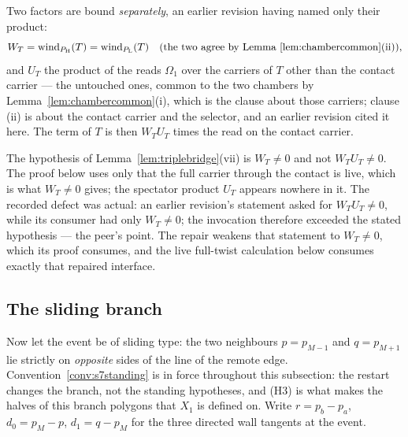 \begin{definition}
Two factors are bound \emph{separately}, an earlier revision having named only
their product:
\[
   W_T=\operatorname{wind}_{P_{\mathrm H}}(T)=\operatorname{wind}_{P_{\mathrm L}}(T)
   \quad\text{(the two agree by Lemma~\ref{lem:chambercommon}(ii))},
\]
and $U_T$ the product of the reads $\Omega_1$ over the carriers of $T$ other
than the contact carrier --- the untouched ones, common to the two chambers by
Lemma~\ref{lem:chambercommon}(i), which is the clause about those carriers;
clause (ii) is about the contact carrier and the selector, and an earlier
revision cited it here. The term of $T$ is then $W_TU_T$ times the read on the contact
carrier.
\end{definition}

\begin{remark}\label{rem:sr12hyp}
The hypothesis of Lemma~\ref{lem:triplebridge}(vii) is $W_T\neq0$ and not $W_TU_T\neq0$. The proof below uses only
that the full carrier through the contact is live, which is what $W_T\neq0$
gives; the spectator product $U_T$ appears nowhere in it. The recorded defect was actual: an earlier revision's statement asked for
$W_TU_T\neq0$, while its consumer had only $W_T\neq0$; the invocation therefore
exceeded the stated hypothesis --- the peer's point. The repair weakens that
statement to $W_T\neq0$, which its proof consumes, and the live full-twist
calculation below consumes exactly that repaired interface.

\end{remark}

\subsection{The sliding branch}\label{sec:sliding}

Now let the event be of sliding type: the two neighbours $p=p_{M-1}$ and
$q=p_{M+1}$ lie strictly on \emph{opposite} sides of the line of the remote
edge. Convention~\ref{conv:s7standing} is in force throughout this subsection: the
restart changes the branch, not the standing hypotheses, and (H3) is what makes
the halves of this branch polygons that $X_1$ is defined on. Write $r=p_b-p_a$,
$d_0=p_M-p$, $d_1=q-p_M$ for the three directed wall tangents at the event.

